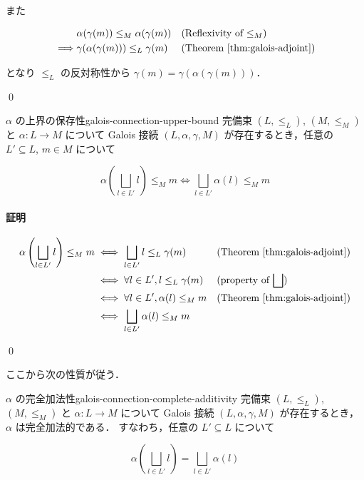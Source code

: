 \documentclass[uplatex]{jsarticle}
\begin{document}
また

\begin{align*}
           & \alpha(\gamma(m)) \leq_M \alpha(\gamma(m))
           &                                            & \text{(Reflexivity of $\leq_M$)}          \\
  \implies & \gamma(\alpha(\gamma(m))) \leq_L \gamma(m)
           &                                            & \text{(Theorem \ref{thm:galois-adjoint})} \\
\end{align*}

となり $\leq_L$ の反対称性から $\gamma(m) = \gamma(\alpha(\gamma(m)))$．

\qed


\begin{boxlemma}{$\alpha$ の上界の保存性}{galois-connection-upper-bound}
  完備束 $(L, \leq_L)$, $(M, \leq_M)$ と $\alpha: L \to M$ について
  Galois 接続 $(L, \alpha, \gamma, M)$ が存在するとき，任意の $L' \subseteq L$, $m \in M$ について

  $$
    \alpha\left( \bigsqcup_{l \in L'} l \right) \leq_M m \iff
    \bigsqcup_{l \in L'} \alpha(l) \leq_M m
  $$
\end{boxlemma}

\paragraph*{証明}

\begin{align*}
  \alpha\left( \bigsqcup_{l \in L'} l \right) \leq_M m
   & \iff \bigsqcup_{l \in L'} l \leq_L \gamma(m)
   &                                              & \text{(Theorem \ref{thm:galois-adjoint})} \\
   & \iff \forall l \in L', l \leq_L \gamma(m)
   &                                              & \text{(property of $\bigsqcup$)}          \\
   & \iff \forall l \in L', \alpha(l) \leq_M m
   &                                              & \text{(Theorem \ref{thm:galois-adjoint})} \\
   & \iff \bigsqcup_{l \in L'} \alpha(l) \leq_M m
\end{align*}

\qed

ここから次の性質が従う．

\begin{boxlemma}{$\alpha$ の完全加法性}{galois-connection-complete-additivity}
  完備束 $(L, \leq_L)$, $(M, \leq_M)$ と $\alpha: L \to M$ について
  Galois 接続 $(L, \alpha, \gamma, M)$ が存在するとき， $\alpha$ は完全加法的である．
  すなわち，任意の $L' \subseteq L$ について

  $$\alpha\left( \bigsqcup_{l \in L'} l \right) = \bigsqcup_{l \in L'} \alpha(l)
  $$
\end{boxlemma}
\end{document}
